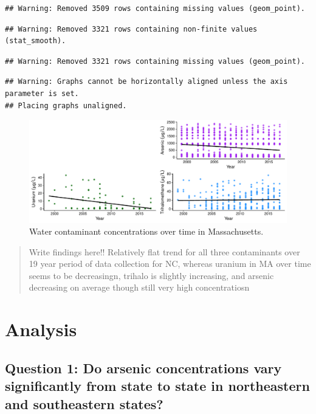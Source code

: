 \documentclass[12pt,]{article}
\begin{document}
\begin{verbatim}
## Warning: Removed 3509 rows containing missing values (geom_point).
\end{verbatim}

\begin{verbatim}
## Warning: Removed 3321 rows containing non-finite values (stat_smooth).
\end{verbatim}

\begin{verbatim}
## Warning: Removed 3321 rows containing missing values (geom_point).
\end{verbatim}

\begin{verbatim}
## Warning: Graphs cannot be horizontally aligned unless the axis parameter is set.
## Placing graphs unaligned.
\end{verbatim}

\begin{figure}
\centering
\includegraphics{Project_Template_files/figure-latex/figs6-1.pdf}
\caption{Water contaminant concentrations over time in Massachusetts.}
\end{figure}

\begin{quote}
Write findings here!! Relatively flat trend for all three contaminants
over 19 year period of data collection for NC, whereas uranium in MA
over time seems to be decreasingn, trihalo is slightly increasing, and
arsenic decreasing on average though still very high concentratiosn
\end{quote}

\newpage

\hypertarget{analysis}{%
\section{Analysis}\label{analysis}}

\hypertarget{question-1-do-arsenic-concentrations-vary-significantly-from-state-to-state-in-northeastern-and-southeastern-states}{%
\subsection{Question 1: Do arsenic concentrations vary significantly
from state to state in northeastern and southeastern
states?}\label{question-1-do-arsenic-concentrations-vary-significantly-from-state-to-state-in-northeastern-and-southeastern-states}}
\end{document}
